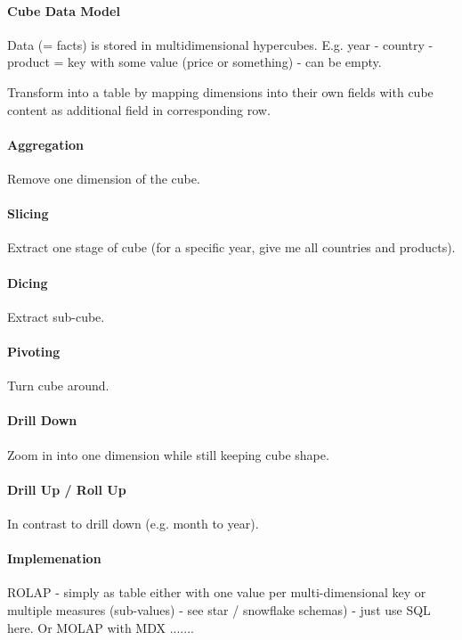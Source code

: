 \paragraph{Cube Data Model}
Data (= facts) is stored in multidimensional hypercubes. E.g. year - country - product = key with some value (price or something) - can be empty.

Transform into a table by mapping dimensions into their own fields with cube content as additional field in corresponding row.

\paragraph{Aggregation}
Remove one dimension of the cube.

\paragraph{Slicing}
Extract one stage of cube (for a specific year, give me all countries and products).

\paragraph{Dicing}
Extract sub-cube.

\paragraph{Pivoting}
Turn cube around.

\paragraph{Drill Down}
Zoom in into one dimension while still keeping cube shape.

\paragraph{Drill Up / Roll Up}
In contrast to drill down (e.g. month to year).


\paragraph{Implemenation}
ROLAP - simply as table either with one value per multi-dimensional key or multiple measures (sub-values) - see star / snowflake schemas) - just use SQL here. Or MOLAP with MDX ....... %







